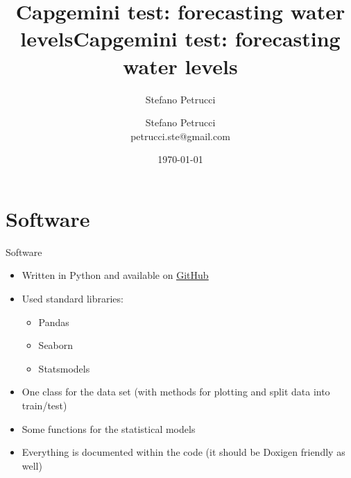 \documentclass[aspectratio=169, glossy]{beamer}
\title{Capgemini test: forecasting water levels}
\author{Stefano Petrucci}
\institute{}
\date{\today}
\begin{document}

\begin{frame}[plain]
\title{\LARGE{\textcolor{MyBlue}{Capgemini test: forecasting water levels}}}
\author{
	Stefano Petrucci\\
	\footnotesize{petrucci.ste@gmail.com}
}
\date{}
\titlepage
\end{frame}


\begin{frame}
  \tableofcontents
\end{frame}

\section{Software}

\begin{frame}{Software}
  \begin{itemize}
    \item Written in Python and available on \href{https://github.com/petruccs/water_test}{\underline{GitHub}}
    \item Used standard libraries:
    \begin{itemize}
      \item Pandas
      \item Seaborn
      \item Statsmodels
    \end{itemize}
    \item One class for the data set (with methods for plotting and split data into train/test)
    \item Some functions for the statistical models
    \item Everything is documented within the code (it should be Doxigen friendly as well)
  \end{itemize}
\end{frame}
\end{document}

